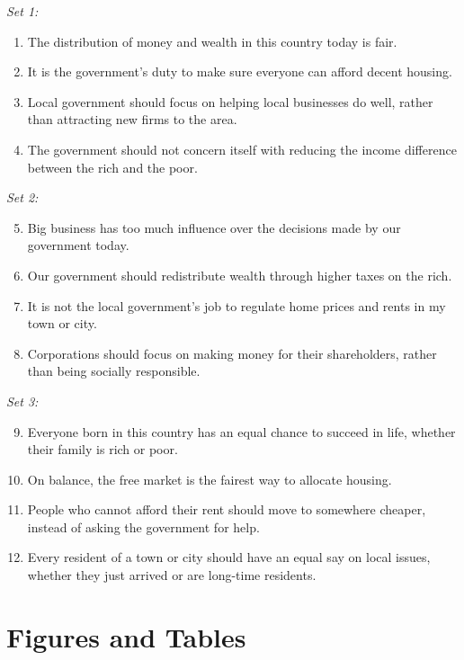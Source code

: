 \documentclass[article,11pt]{memoir}
\begin{document}
\vspace{1em}\noindent \emph{Set 1:}
\begin{enumerate}
  \item The distribution of money and wealth in this country today is fair.
  \item It is the government's duty to make sure everyone can afford decent housing.
  \item Local government should focus on helping local businesses do well, rather than attracting new firms to the area.
  \item The government should not concern itself with reducing the income difference between the rich and the poor.
\end{enumerate}

\noindent \emph{Set 2:}
\begin{enumerate}
  \setcounter{enumi}{4}
  \item Big business has too much influence over the decisions made by our government today.
  \item Our government should redistribute wealth through higher taxes on the rich.
  \item It is not the local government's job to regulate home prices and rents in my town or city.
  \item Corporations should focus on making money for their shareholders, rather than being socially responsible.
\end{enumerate}

\noindent \emph{Set 3:}
\begin{enumerate}
  \setcounter{enumi}{8}  
  \item Everyone born in this country has an equal chance to succeed in life, whether their family is rich or poor.
  \item On balance, the free market is the fairest way to allocate housing.
  \item People who cannot afford their rent should move to somewhere cheaper, instead of asking the government for help.
  \item Every resident of a town or city should have an equal say on local issues, whether they just arrived or are long-time residents.
\end{enumerate}

\clearpage
\section{Figures and Tables}
\end{document}
